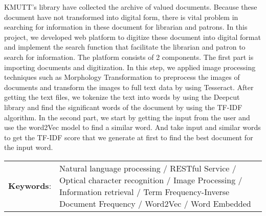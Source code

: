 \documentclass[12pt,oneside,openright,a4paper]{cpe-thai-project}
\begin{document}
\makesignaturepage 

\abstract

KMUTT's library have collected the archive of valued documents. 
Because these document have not transformed into digital form, 
there is vital problem in searching for information in these 
document for librarian and patrons. In this project, we developed 
web platform to digitize these document into digital format 
and implement the search function that facilitate the librarian 
and patron to search for information. The platform consists of 
2 components. The first part is importing documents and 
digitization. In this step, we applied image processing 
techniques such as Morphology Transformation to preprocess
the images of documents and transform the images to full text 
data by using Tesseract. After getting the text files, we tokenize 
the text into words by using the Deepcut library and find the 
significant words of the document by using the TF-IDF algorithm. 
In the second part, we start by getting the input from the user 
and use the word2Vec model to find a similar word. And take 
input and similar words to get the TF-IDF score that we 
generate at first to find the best document for the input word.  

\begin{flushleft}
\begin{tabular*}{\textwidth}{@{}lp{}}
\textbf{Keywords}: & Natural language processing / RESTful Service / Optical character recognition / Image Processing / Information retrieval / Term Frequency-Inverse Document Frequency / Word2Vec / Word Embedded 
\end{tabular*}
\end{flushleft}
\endabstract
\end{document}
